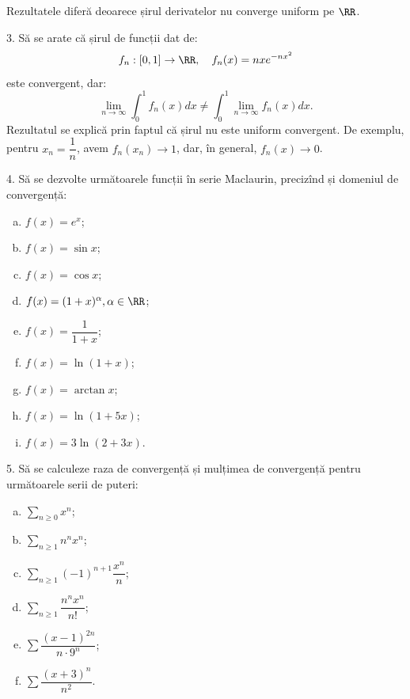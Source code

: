 Rezultatele diferă deoarece șirul derivatelor nu converge uniform pe $ \RR $.

\vspace{1cm}

3. Să se arate că șirul de funcții dat de:
\[
  f_n : [0, 1] \to \RR, \quad f_n(x) = nxe^{-nx^2}
\]
este convergent, dar:
\[
  \lim_{n \to \infty} \int_0^1 f_n(x) dx \neq \int_0^1 \lim_{n \to \infty} f_n(x) dx.
\]
Rezultatul se explică prin faptul că șirul nu este uniform convergent.
De exemplu, pentru $ x_n = \dfrac{1}{n} $, avem $ f_n(x_n) \to 1 $, dar,
în general, $ f_n(x) \to 0 $.

\vspace{1cm}

4. Să se dezvolte următoarele funcții în serie Maclaurin, precizînd și
domeniul de convergență:
\begin{enumerate}[(a)]
\item $ f(x) = e^x $;
\item $ f(x) = \sin x $;
\item $ f(x) = \cos x $;
\item $ f(x) = (1 + x)^\alpha, \alpha \in \RR $;
\item $ f(x) = \dfrac{1}{1 + x} $;
\item $ f(x) = \ln(1 + x) $;
\item $ f(x) = \arctan x $;
\item $ f(x) = \ln(1 + 5x)$;
\item $ f(x) = 3 \ln(2 + 3x) $.
\end{enumerate}


\vspace{1cm}

5. Să se calculeze raza de convergență și mulțimea de convergență pentru
următoarele serii de puteri:
\begin{enumerate}[(a)]
\item $ \sum_{n \geq 0} x^n $;
\item $ \sum_{n \geq 1} n^n x^n $;
\item $ \sum_{n \geq 1} (-1)^{n+1} \dfrac{x^n}{n} $;
\item $ \sum_{n \geq 1} \dfrac{n^nx^n}{n!} $;
\item $ \sum \dfrac{(x - 1)^{2n}}{n \cdot 9^n} $;
\item $ \sum \dfrac{(x + 3)^n}{n^2} $.
\end{enumerate}

\vspace{1cm}

